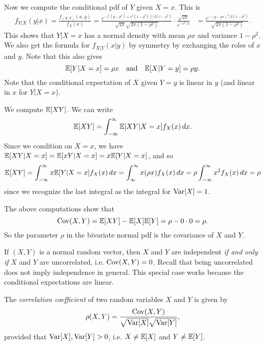 \begin{example}
  Now we compute the conditional pdf of $Y$
  given $X = x$. This is
  \begin{align*}
    f_{Y | X}(y | x)
    = \frac{f_{(X, Y)}(x, y)}{f_X(x)}
    = \frac{e^{-((y - \rho^2) + x^2(1 - \rho^2)) / 2(1 - \rho^2)}}{\sqrt{2\pi} \sqrt{2\pi (1 - \rho^2)}} 
    \cdot \frac{\sqrt{2\pi}}{e^{-x^2 / 2}}
    &= \frac{e^{-(y - \rho x)^2 / 2(1 - \rho^2)}}{\sqrt{2\pi(1 - \rho^2)}}.
  \end{align*}
  This shows that $Y | X = x$ has a normal
  density with mean $\rho x$ and variance $1 - \rho^2$.
  We also get the formula for $f_{X | Y}(x | y)$
  by symmetry by exchanging the roles of $x$ and $y$.
  Note that this also gives
  \[
    \mathbb{E}[Y | X = x] = \rho x \quad \text{and} \quad
    \mathbb{E}[X | Y = y] = \rho y.
  \]
  Note that the conditional expectation of
  $X$ given $Y = y$ is linear in $y$ (and linear
  in $x$ for $Y | X = x$).
\end{example}

\begin{example}
  We compute $\mathbb{E}[XY]$. We can write
  \[
    \mathbb{E}[XY] = \int_{-\infty}^\infty \mathbb{E}[XY | X = x] f_X(x)\, dx.
  \]
  Since we condition on $X = x$, we have
  $\mathbb{E}[XY | X = x] = \mathbb{E}[xY | X = x] = x \mathbb{E}[Y | X = x]$, and so
  \[
    \mathbb{E}[XY] = \int_{-\infty}^\infty x \mathbb{E}[Y | X = x] f_X(x)\, dx
    = \int_{\infty}^\infty x (\rho x) f_X(x)\, dx
    = \rho \int_{-\infty}^\infty x^2 f_X(x)\, dx
    = \rho
  \]
  since we recognize the last integral as
  the integral for $\operatorname{Var}[X] = 1$.
\end{example}

\begin{remark}
  The above computations show that
  \[
    \operatorname{Cov}(X, Y) = \mathbb{E}[XY] - \mathbb{E}[X] \mathbb{E}[Y] = \rho - 0 \cdot 0 = \rho.
  \]
  So the parameter $\rho$ in the bivariate normal
  pdf is the covariance of $X$ and $Y$.
\end{remark}

\begin{remark}
  If $(X, Y)$ is a normal random vector, then
  $X$ and $Y$ are independent \emph{if and only if}
  $X$ and $Y$ are uncorrelated, i.e. $\operatorname{Cov}(X, Y) = 0$.
  Recall that being uncorrelated does not
  imply independence in general. This special case
  works because the conditional expectations are
  linear.
\end{remark}

\begin{definition}
  The \emph{correlation coefficient} of two random
  variables $X$ and $Y$ is given by
  \[
  \rho(X, Y) = \frac{\operatorname{Cov}(X, Y)}{\sqrt{\operatorname{Var}[X]} \sqrt{\operatorname{Var}[Y]}},
  \]
  provided that $\operatorname{Var}[X], \operatorname{Var}[Y] > 0$, i.e.
  $X \ne \mathbb{E}[X]$ and $Y \ne \mathbb{E}[Y]$.
\end{definition}

